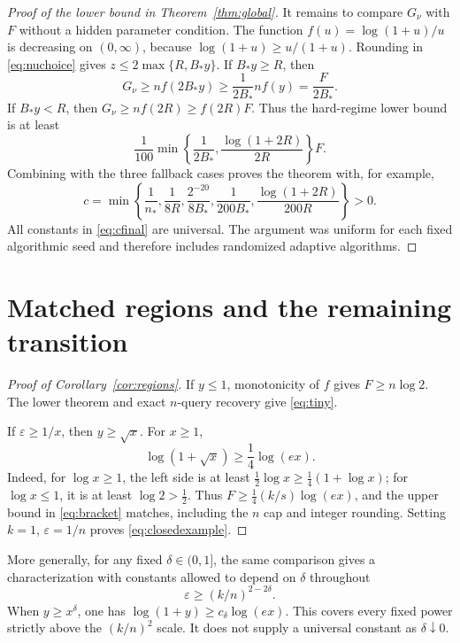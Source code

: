 \documentclass[11pt]{article}
\numberwithin{equation}{section}
\theoremstyle{remark}\newtheorem{remark}[theorem]{Remark}
\newcommand{\eps}{\varepsilon}
\begin{document}
\begin{proof}[Proof of the lower bound in Theorem~\ref{thm:global}]
It remains to compare $G_\nu$ with $F$ without a hidden parameter condition. The function $f(u)=\log(1+u)/u$ is decreasing on $(0,\infty)$, because $\log(1+u)\ge u/(1+u)$. Rounding in \eqref{eq:nuchoice} gives
$z\le2\max\{R,B_*y\}$. If $B_*y\ge R$, then
\[
G_\nu\ge n f(2B_*y)\ge\frac1{2B_*}n f(y)=\frac{F}{2B_*}.
\]
If $B_*y<R$, then $G_\nu\ge n f(2R)\ge f(2R)F$. Thus the hard-regime lower bound is at least
\[
\frac1{100}\min\left\{\frac1{2B_*},\frac{\log(1+2R)}{2R}\right\}F.
\]
Combining with the three fallback cases proves the theorem with, for example,
\begin{equation}\label{eq:cfinal}
c=\min\left\{\frac1{n_*},\frac1{8R},\frac{2^{-20}}{8B_*},
\frac1{200B_*},\frac{\log(1+2R)}{200R}\right\}>0.
\end{equation}
All constants in \eqref{eq:cfinal} are universal. The argument was uniform for each fixed algorithmic seed and therefore includes randomized adaptive algorithms.
\end{proof}

\section{Matched regions and the remaining transition}\label{sec:scope}
\begin{proof}[Proof of Corollary~\ref{cor:regions}]
If $y\le1$, monotonicity of $f$ gives $F\ge n\log2$. The lower theorem and exact $n$-query recovery give \eqref{eq:tiny}.

If $\eps\ge1/x$, then $y\ge\sqrt x$. For $x\ge1$,
\[
\log(1+\sqrt x)\ge\frac14\log(ex).
\]
Indeed, for $\log x\ge1$, the left side is at least $\tfrac12\log x\ge\tfrac14(1+\log x)$; for $\log x\le1$, it is at least $\log2>\tfrac12$. Thus $F\ge\tfrac14(k/s)\log(ex)$, and the upper bound in \eqref{eq:bracket} matches, including the $n$ cap and integer rounding. Setting $k=1$, $\eps=1/n$ proves \eqref{eq:closedexample}.
\end{proof}
More generally, for any fixed $\delta\in(0,1]$, the same comparison gives a characterization with constants allowed to depend on $\delta$ throughout
\begin{equation}\label{eq:fixedpower}
\eps\ge(k/n)^{2-2\delta}.
\end{equation}
When $y\ge x^\delta$, one has $\log(1+y)\ge c_\delta\log(ex)$. This covers every fixed power strictly above the $(k/n)^2$ scale. It does not supply a universal constant as $\delta\downarrow0$.
\end{document}
